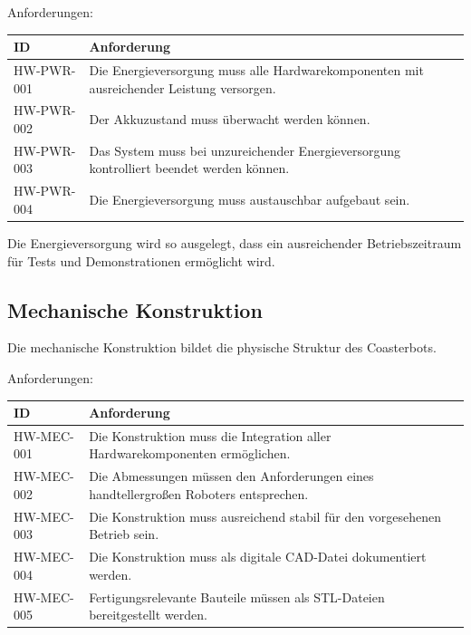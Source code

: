 \documentclass[
  a4paper,
  12pt,
  DIV=12,        %
  parskip=half,  %
  headings=small %
]{scrartcl}
\theoremstyle{definition}
\theoremstyle{definition}
\begin{document}
Anforderungen:

\begin{longtable}[]{@{}
  >{\raggedright\arraybackslash}p{}
  >{\raggedright\arraybackslash}p{}@{}}
\toprule\noalign{}
\begin{minipage}[b]{\linewidth}\raggedright
ID
\end{minipage} & \begin{minipage}[b]{\linewidth}\raggedright
Anforderung
\end{minipage} \\
\midrule\noalign{}
\endhead
\bottomrule\noalign{}
\endlastfoot
HW-PWR-001 & Die Energieversorgung muss alle Hardwarekomponenten mit
ausreichender Leistung versorgen. \\
HW-PWR-002 & Der Akkuzustand muss überwacht werden können. \\
HW-PWR-003 & Das System muss bei unzureichender Energieversorgung
kontrolliert beendet werden können. \\
HW-PWR-004 & Die Energieversorgung muss austauschbar aufgebaut sein. \\
\end{longtable}

Die Energieversorgung wird so ausgelegt, dass ein ausreichender
Betriebszeitraum für Tests und Demonstrationen ermöglicht wird.

\subsection{Mechanische Konstruktion}\label{mechanische-konstruktion}

Die mechanische Konstruktion bildet die physische Struktur des
Coasterbots.

Anforderungen:

\begin{longtable}[]{@{}
  >{\raggedright\arraybackslash}p{}
  >{\raggedright\arraybackslash}p{}@{}}
\toprule\noalign{}
\begin{minipage}[b]{\linewidth}\raggedright
ID
\end{minipage} & \begin{minipage}[b]{\linewidth}\raggedright
Anforderung
\end{minipage} \\
\midrule\noalign{}
\endhead
\bottomrule\noalign{}
\endlastfoot
HW-MEC-001 & Die Konstruktion muss die Integration aller
Hardwarekomponenten ermöglichen. \\
HW-MEC-002 & Die Abmessungen müssen den Anforderungen eines
handtellergroßen Roboters entsprechen. \\
HW-MEC-003 & Die Konstruktion muss ausreichend stabil für den
vorgesehenen Betrieb sein. \\
HW-MEC-004 & Die Konstruktion muss als digitale CAD-Datei dokumentiert
werden. \\
HW-MEC-005 & Fertigungsrelevante Bauteile müssen als STL-Dateien
bereitgestellt werden. \\
\end{longtable}
\end{document}
